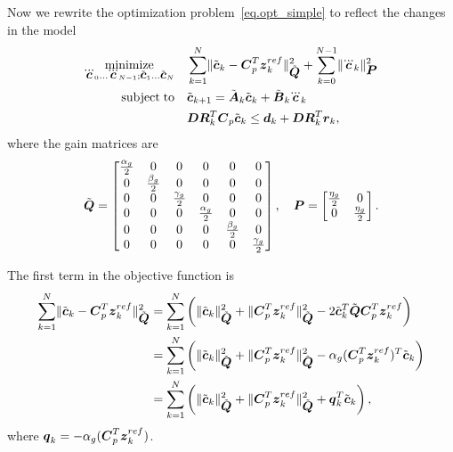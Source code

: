 Now we rewrite the optimization problem~\eqref{eq.opt_simple} to reflect the changes 
in the model
\begin{equation}\label{eq.opt}
\begin{split}
\minimize{\dddot{\mbm{c}}_0 \dots \dddot{\mbm{c}}_{N-1}; \tilde{\mbm{c}}_1 \dots \tilde{\mbm{c}}_{N}}
            & \sum_{k=1}^{N}    \norm{ \tilde{\mbm{c}}_k - \mbm{C}_p^T \mbm{z}_k^{ref} }^2_{\tilde{\mbm{Q}}} 
            + \sum_{k=0}^{N-1}  \norm{ \dddot{\mbm{c}}_k }^2_{\mbm{P}}\\ 
\subjectto  & \tilde{\mbm{c}}_{k+1} = \tilde{\mbm{A}}_k\tilde{\mbm{c}}_{k} + \tilde{\mbm{B}}_k\dddot{\mbm{c}}_{k}\\
            & \mbm{D}\mbm{R}^T_k \mbm{C}_p \tilde{\mbm{c}}_k \leq \mbm{d}_{k} + \mbm{D}\mbm{R}^T_k \mbm{r}_k, 
\end{split}
\end{equation}
where the gain matrices are
$$
\tilde{\mbox{\boldmath $Q$}} =
\begin{bmatrix}
    \frac{\alpha_g}{2} & 0                 & 0 & 0 & 0 & 0\\ 
    0               & \frac{\beta_g}{2}  & 0 & 0 & 0 & 0\\ 
    0               & 0                 & \frac{\gamma_g}{2} & 0 & 0 & 0\\ 
    0 & 0 & 0 & \frac{\alpha_g}{2} & 0                 & 0 \\ 
    0 & 0 & 0 & 0               & \frac{\beta_g}{2}  & 0 \\ 
    0 & 0 & 0 & 0               & 0                 & \frac{\gamma_g}{2} \\ 
\end{bmatrix}, \quad
\mbox{\boldmath $P$} = 
\begin{bmatrix}
      \frac{\eta_g}{2}  & 0  \\ 
      0                 &  \frac{\eta_g}{2} \\ 
\end{bmatrix}.
$$

The first term in the objective function is
\begin{equation*}
\begin{split}
    \sum_{k=1}^{N} \lVert \tilde{\mbox{\boldmath $c$}}_k - \mbox{\boldmath $C$}_p^T \mbox{\boldmath $z$}_k^{ref} \rVert^2_{\tilde{\mbox{\boldmath $Q$}}} &=
    \sum_{k=1}^{N} \left(
        \lVert \tilde{\mbox{\boldmath $c$}}_k \rVert^2_{\tilde{\mbox{\boldmath $Q$}}} 
        + \lVert \mbox{\boldmath $C$}_p^T \mbox{\boldmath $z$}_k^{ref} \rVert^2_{\tilde{\mbox{\boldmath $Q$}}}
        - 2 \tilde{\mbox{\boldmath $c$}}_k^T \tilde{\mbox{\boldmath $Q$}} \mbox{\boldmath $C$}_p^T \mbox{\boldmath $z$}_k^{ref}
    \right)\\
    &= \sum_{k=1}^{N} \left(
        \lVert \tilde{\mbox{\boldmath $c$}}_k \rVert^2_{\tilde{\mbox{\boldmath $Q$}}} 
        + \lVert \mbox{\boldmath $C$}_p^T \mbox{\boldmath $z$}_k^{ref} \rVert^2_{\tilde{\mbox{\boldmath $Q$}}}
        - \alpha_g (\mbox{\boldmath $C$}_p^T \mbox{\boldmath $z$}_k^{ref})^T \tilde{\mbox{\boldmath $c$}}_k
    \right)\\
    &= \sum_{k=1}^{N} \left(
        \lVert \tilde{\mbox{\boldmath $c$}}_k \rVert^2_{\tilde{\mbox{\boldmath $Q$}}} 
        + \lVert \mbox{\boldmath $C$}_p^T \mbox{\boldmath $z$}_k^{ref} \rVert^2_{\tilde{\mbox{\boldmath $Q$}}}
        + \mbox{\boldmath $q$}_k^T \tilde{\mbox{\boldmath $c$}}_k
    \right),
\end{split}
\end{equation*}
where $\mbox{\boldmath $q$}_k = - \alpha_g (\mbox{\boldmath $C$}_p^T \mbox{\boldmath $z$}_k^{ref})$.

